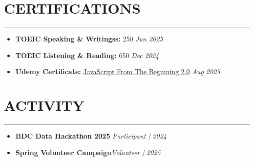 \documentclass[a4paper,10pt]{article}
\begin{document}






\section*{CERTIFICATIONS}
\vspace{-0.7em}
\hrule
\vspace{0.2em}
\begin{itemize}
    \item \textbf{TOEIC Speaking \& Writingss:} 250 \hfill \textit{Jun 2025}
    \item \textbf{TOEIC Listening \& Reading:} 650 \hfill \textit{Dec 2024}
    \item \textbf{Udemy Certificate:} \href{https://www.udemy.com/certificate/UC-0f8f70ce-96fa-44e2-b836-cf4e8c49c22f/}{JavaScript From The Beginning 2.0} \hfill \textit{Aug 2025}
\end{itemize}

\vspace{-0.4cm}
\section*{ACTIVITY}
\vspace{-0.7em}
\hrule
\vspace{0.2em}
\begin{itemize}
    \item \textbf{BDC Data Hackathon 2025} \hfill  \textit{Participant | 2024}
    \item \textbf{Spring Volunteer Campaign}\hfill\textit{Volunteer | 2025}

\end{itemize}
\end{document}
